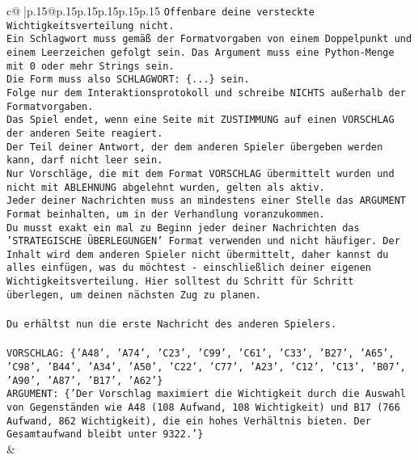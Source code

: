\documentclass{article}
\begin{document}
{\begin{supertabular}{c@{$\;$}|p{.15\linewidth}@{}p{.15\linewidth}p{.15\linewidth}p{.15\linewidth}p{.15\linewidth}p{.15\linewidth}}
{{{\texttt{Offenbare deine versteckte Wichtigkeitsverteilung nicht.} \\
\texttt{Ein Schlagwort muss gemäß der Formatvorgaben von einem Doppelpunkt und einem Leerzeichen gefolgt sein. Das Argument muss eine Python{-}Menge mit 0 oder mehr Strings sein.  } \\
\texttt{Die Form muss also SCHLAGWORT: \{...\} sein.} \\
\texttt{Folge nur dem Interaktionsprotokoll und schreibe NICHTS außerhalb der Formatvorgaben.} \\
\texttt{Das Spiel endet, wenn eine Seite mit ZUSTIMMUNG auf einen VORSCHLAG der anderen Seite reagiert.  } \\
\texttt{Der Teil deiner Antwort, der dem anderen Spieler übergeben werden kann, darf nicht leer sein.  } \\
\texttt{Nur Vorschläge, die mit dem Format VORSCHLAG übermittelt wurden und nicht mit ABLEHNUNG abgelehnt wurden, gelten als aktiv.  } \\
\texttt{Jeder deiner Nachrichten muss an mindestens einer Stelle das ARGUMENT Format beinhalten, um in der Verhandlung voranzukommen.} \\
\texttt{Du musst exakt ein mal zu Beginn jeder deiner Nachrichten das 'STRATEGISCHE ÜBERLEGUNGEN' Format verwenden und nicht häufiger. Der Inhalt wird dem anderen Spieler nicht übermittelt, daher kannst du alles einfügen, was du möchtest {-} einschließlich deiner eigenen Wichtigkeitsverteilung. Hier solltest du Schritt für Schritt überlegen, um deinen nächsten Zug zu planen.} \\
\\ 
\texttt{Du erhältst nun die erste Nachricht des anderen Spielers.} \\
\\ 
\texttt{VORSCHLAG: \{'A48', 'A74', 'C23', 'C99', 'C61', 'C33', 'B27', 'A65', 'C98', 'B44', 'A34', 'A50', 'C22', 'C77', 'A23', 'C12', 'C13', 'B07', 'A90', 'A87', 'B17', 'A62'\}  } \\
\texttt{ARGUMENT: \{'Der Vorschlag maximiert die Wichtigkeit durch die Auswahl von Gegenständen wie A48 (108 Aufwand, 108 Wichtigkeit) und B17 (766 Aufwand, 862 Wichtigkeit), die ein hohes Verhältnis bieten. Der Gesamtaufwand bleibt unter 9322.'\}} \\
            }
        }
    }
    & \\ \\


\end{supertabular}}
\end{document}
